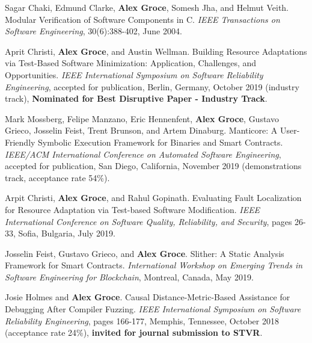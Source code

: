 \documentclass[ComputerScience]{vita}
\begin{document}
\begin{vita}
\begin{Refereed Journal Publications}
\item
Sagar Chaki, Edmund Clarke, {\bf Alex Groce}, Somesh Jha, and Helmut Veith.
\newblock Modular Verification of Software Components in C.
\newblock \emph{IEEE Transactions on Software Engineering}, 30(6):388-402, June 2004.

\end{Refereed Journal Publications}

\begin{Refereed Conference and Workshop Publications}
\item Aprit Christi, {\bf Alex Groce}, and Austin Wellman.
\newblock Building Resource Adaptations via Test-Based Software
Minimization: Application, Challenges, and Opportunities.
\newblock \emph{IEEE International Symposium on Software Reliability 
  Engineering}, accepted for publication, Berlin, Germany, October
2019 (industry track), {\bf Nominated for Best Disruptive Paper - Industry Track}.
  
\item Mark Mossberg, Felipe Manzano, Eric Hennenfent, {\bf Alex
    Groce}, Gustavo Grieco, Josselin Feist, Trent Brunson, and Artem Dinaburg.
\newblock Manticore: A User-Friendly Symbolic Execution Framework for Binaries and Smart Contracts.
\newblock \emph{IEEE/ACM International Conference on Automated Software
  Engineering}, accepted for publication, San Diego, California,
November 2019 (demonstrations track, acceptance rate 54\%).
  
\item Arpit Christi, {\bf Alex Groce}, and Rahul Gopinath.
\newblock Evaluating Fault Localization for Resource Adaptation via Test-based Software Modification.
\newblock \emph{IEEE International Conference on Software Quality,
  Reliability, and Security}, pages 26-33,
Sofia, Bulgaria, July 2019.

\item Josselin Feist, Gustavo Grieco, and {\bf Alex Groce}. 
\newblock Slither: A Static Analysis Framework for Smart Contracts. 
\newblock \emph{International Workshop on Emerging Trends in Software
  Engineering for Blockchain}, Montreal,
Canada, May 2019.
  
\item Josie Holmes and {\bf Alex Groce}. 
\newblock Causal Distance-Metric-Based Assistance for Debugging After 
Compiler Fuzzing. 
\newblock \emph{IEEE International Symposium on Software Reliability 
  Engineering}, pages 166-177, Memphis, Tennessee, October 
2018 (acceptance rate 24\%), {\bf invited for journal submission to STVR}.


\end{Refereed Conference and Workshop Publications}
\end{vita}
\end{document}
